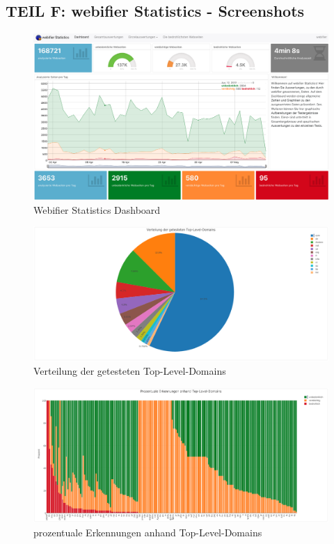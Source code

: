 \begin{landscape}

\section*{TEIL F: webifier Statistics - Screenshots}
\label{app:f}

\begin{figure}[H]
  \centering
  \includegraphics[width=\textheight]{images/stats/dashboard}
  \caption{Webifier Statistics Dashboard}
\end{figure}

\begin{figure}[H]
  \centering
  \includegraphics[width=\textheight]{images/stats/tldverteilung}
  \caption{Verteilung der getesteten Top-Level-Domains}
\end{figure}


\begin{figure}[H]
  \centering
  \includegraphics[width=\textheight]{images/stats/tldprozentual}
  \caption{prozentuale Erkennungen anhand Top-Level-Domains}
\end{figure}



\end{landscape}

